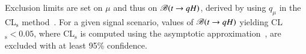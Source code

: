 Exclusion limits are set on $\mu$ and thus on
$\mathscr{B}(t\rightarrow qH)$, derived by using $q_\mu$ in the CL$_{\textrm{s}}$ method~\cite{Junk:1999kv,Read:2002hq}.
For a given signal scenario, values of $\mathscr{B}(t\rightarrow qH)$ yielding CL$_{\textrm{s}} < 0.05$,
where CL$_{\textrm{s}}$ is computed using the asymptotic approximation~\cite{Cowan:2010js}, are excluded with at least 95\% confidence.
